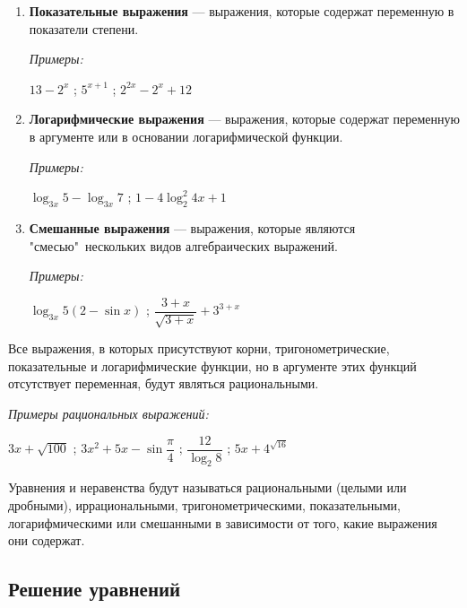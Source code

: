 \documentclass[12pt, a4paper]{article}
\begin{document}
\begin{enumerate}
	\item \textbf{Показательные выражения} — выражения, которые содержат переменную в показатели степени.
	
	\textit{Примеры:}
	\begin{center}
		$13-2^x$ ; $5^{x+1}$ ; $2^{2x}-2^x+12$
	\end{center}

	\item \textbf{Логарифмические выражения} — выражения, которые содержат переменную в аргументе или в основании логарифмической функции.
	
	\textit{Примеры:}
	\begin{center}
		$\log_{3x} {5}-\log_{3x} {7}$ ; $1-4\log^2_2 {4x+1}$
	\end{center}

	\item \textbf{Смешанные выражения} — выражения, которые являются "смесью"\ нескольких видов алгебраических выражений.
	
	\textit{Примеры:}
	\begin{center}
		$\log_{3x} {5}(2-\sin{x})$ ; $\dfrac{3+x}{\sqrt{3+x}}+3^{3+x}$
	\end{center}
\end{enumerate}

Все выражения, в которых присутствуют корни, тригонометрические, показательные и логарифмические функции, но в аргументе этих функций отсутствует переменная, будут являться рациональными.

\textit{Примеры рациональных выражений:}
\begin{center}
	$3x+\sqrt{100}$ ; $3x^2+5x-\sin{\dfrac{\pi}{4}}$ ; $\dfrac{12}{\log_2 8}$ ; $5x + 4^{\sqrt{16}}$
\end{center}

Уравнения и неравенства будут называться рациональными (целыми или дробными), иррациональными, тригонометрическими, показательными, логарифмическими или смешанными в зависимости от того, какие выражения они содержат.

\subsection*{Решение уравнений}
\end{document}
